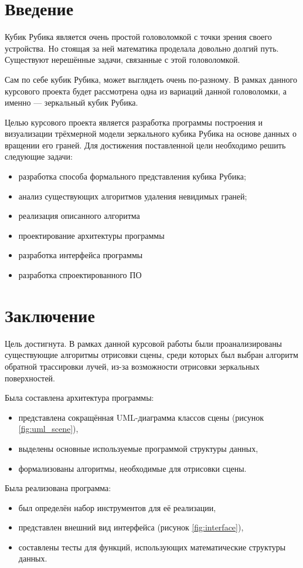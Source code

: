 \section*{Введение}
Кубик Рубика является очень простой головоломкой с точки зрения своего устройства. Но стоящая за ней математика проделала довольно долгий путь. Существуют нерешённые задачи, связанные с этой головоломкой.

Сам по себе кубик Рубика, может выглядеть очень по-разному. В рамках данного курсового проекта будет рассмотрена одна из вариаций данной головоломки, а именно --- зеркальный кубик Рубика.

Целью курсового проекта является разработка программы построения и визуализации трёхмерной модели зеркального кубика Рубика на основе данных о вращении его граней. Для достижения поставленной цели необходимо решить следующие задачи:
\begin{itemize}
	\item разработка способа формального представления кубика Рубика;
	\item анализ существующих алгоритмов удаления невидимых граней;
	\item реализация описанного алгоритма
	\item проектирование архитектуры программы
	\item разработка интерфейса программы
	\item разработка спроектированного ПО
\end{itemize}






\section*{Заключение}
Цель достигнута. В рамках данной курсовой работы были проанализированы существующие алгоритмы отрисовки сцены, среди которых был выбран алгоритм обратной трассировки лучей, из-за возможности отрисовки зеркальных поверхностей.

Была составлена архитектура программы:
\begin{itemize}
	\item представлена сокращённая UML-диаграмма классов сцены (рисунок \ref{fig:uml_scene}),
	\item выделены основные используемые программой структуры данных,
	\item формализованы алгоритмы, необходимые для отрисовки сцены.
\end{itemize}

Была реализована программа:
\begin{itemize}
	\item был определён набор инструментов для её реализации,
	\item представлен внешний вид интерфейса (рисунок \ref{fig:interface}),
	\item составлены тесты для функций, использующих математические структуры данных.
\end{itemize}




